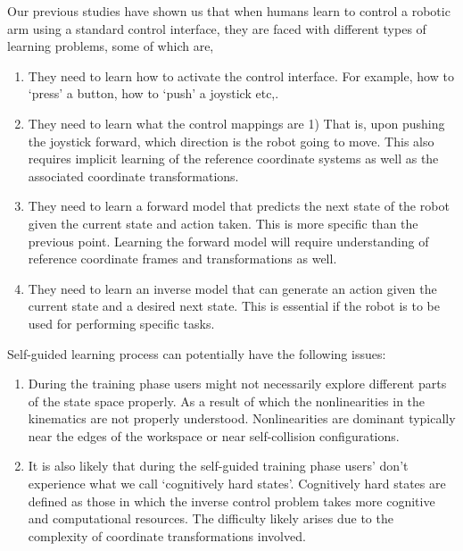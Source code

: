 \documentclass[12pt]{article}
\begin{document}

Our previous studies have shown us that when humans learn to control a robotic arm using a standard control interface, they are faced with different types of learning problems, some of which are,
\begin{enumerate}
	\item They need to learn how to activate the control interface. For example, how to `press' a button, how to `push' a joystick etc,.
	\item They need to learn what the control mappings are 1) That is, upon pushing the joystick forward, which direction is the robot going to move. This also requires implicit learning of the reference coordinate systems as well as the associated coordinate transformations. 
	\item They need to learn a forward model that predicts the next state of the robot given the current state and action taken. This is more specific than the previous point. Learning the forward model will require understanding of reference coordinate frames and transformations as well. 
	\item They need to learn an inverse model that can generate an action given the current state and a desired next state. This is essential if the robot is to be used for performing specific tasks. 
\end{enumerate}
Self-guided learning process can potentially have the following issues:
\begin{enumerate}
	\item During the training phase users might not necessarily explore different parts of the state space properly. As a result of which the nonlinearities in the kinematics are not properly understood. Nonlinearities are dominant typically near the edges of the workspace or near self-collision configurations. 
	\item It is also likely that during the self-guided training phase users' don't experience what we call `cognitively hard states'. Cognitively hard states are defined as those in which the inverse control problem takes more cognitive and computational resources. The difficulty likely arises due to the complexity of coordinate transformations involved. 
\end{enumerate}
\end{document}
